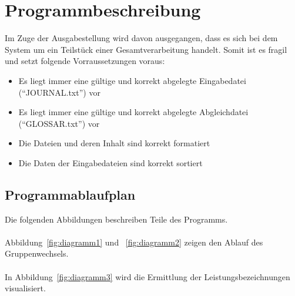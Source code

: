 \chapter{Programmbeschreibung}\label{ch:programmbeschreibung}
Im Zuge der Ausgabestellung wird davon ausgegangen, dass es sich bei dem System um ein Teilstück einer Gesamtverarbeitung handelt. Somit ist es fragil und setzt folgende Vorraussetzungen voraus: \\

\begin{itemize}[noitemsep]
    \item Es liegt immer eine gültige und korrekt abgelegte Eingabedatei (\enquote{JOURNAL.txt}) vor
    \item Es liegt immer eine gültige und korrekt abgelegte Abgleichdatei (\enquote{GLOSSAR.txt}) vor
    \item Die Dateien und deren Inhalt sind korrekt formatiert
    \item Die Daten der Eingabedateien sind korrekt sortiert

\end{itemize}

\section{Programmablaufplan}\label{sec:pap}
Die folgenden Abbildungen beschreiben Teile des Programms.\\
\\
Abbildung~\ref{fig:diagramm1} und ~\ref{fig:diagramm2} zeigen den Ablauf des Gruppenwechsels.\\
\\
In Abbildung~\ref{fig:diagramm3} wird die Ermittlung der Leistungsbezeichnungen visualisiert.


